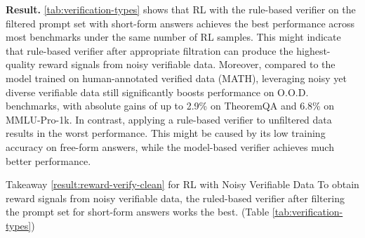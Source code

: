 \noindent\textbf{Result.} \autoref{tab:verification-types} shows that RL with the rule-based verifier on the filtered prompt set with short-form answers achieves the best performance across most benchmarks under the same number of RL samples. This might indicate that rule-based verifier after appropriate filtration can produce the highest-quality reward signals from noisy verifiable data.
Moreover, compared to the model trained on human-annotated verified data (MATH), leveraging noisy yet diverse verifiable data still significantly boosts performance on O.O.D. benchmarks, with absolute gains of up to 2.9\% on TheoremQA and 6.8\% on MMLU-Pro-1k. In contrast, applying a rule-based verifier to unfiltered data results in the worst performance.
This might be caused by its low training accuracy on free-form answers, while the model-based verifier achieves much better performance.

\begin{AIbox}{Takeaway \hypersetup{hidelinks}\ref{result:reward-verify-clean} for RL with Noisy Verifiable Data}
To obtain reward signals from noisy verifiable data, the ruled-based verifier after filtering the prompt set for short-form answers works the best. (Table \ref{tab:verification-types})
\end{AIbox}
